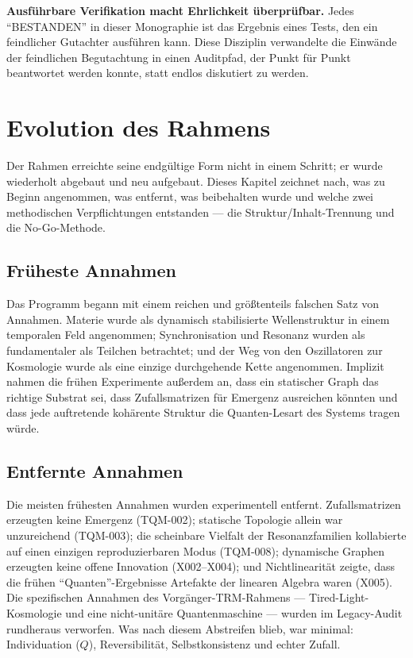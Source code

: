 \documentclass[10pt,twoside,openany]{book}
\begin{document}
\textbf{Ausführbare Verifikation macht Ehrlichkeit überprüfbar.} Jedes ``BESTANDEN'' in
dieser Monographie ist das Ergebnis eines Tests, den ein feindlicher Gutachter ausführen
kann.
Diese Disziplin verwandelte die Einwände der feindlichen Begutachtung in einen
Auditpfad, der Punkt für Punkt beantwortet werden konnte, statt endlos diskutiert zu
werden.

\chapter{Evolution des Rahmens}
\label{ch:evolution}

Der Rahmen erreichte seine endgültige Form nicht in einem Schritt; er wurde wiederholt
abgebaut und neu aufgebaut. Dieses Kapitel zeichnet nach, was zu Beginn angenommen, was
entfernt, was beibehalten wurde und welche zwei methodischen Verpflichtungen entstanden
--- die Struktur/Inhalt-Trennung und die No-Go-Methode.

\section{Früheste Annahmen}

Das Programm begann mit einem reichen und größtenteils falschen Satz von Annahmen. Materie
wurde als dynamisch stabilisierte Wellenstruktur in einem temporalen Feld angenommen;
Synchronisation und Resonanz wurden als fundamentaler als Teilchen betrachtet; und der Weg
von den Oszillatoren zur Kosmologie wurde als eine einzige durchgehende Kette angenommen.
Implizit nahmen die frühen Experimente außerdem an, dass ein statischer Graph das richtige
Substrat sei, dass Zufallsmatrizen für Emergenz ausreichen könnten und dass jede
auftretende kohärente Struktur die Quanten-Lesart des Systems tragen würde.

\section{Entfernte Annahmen}

Die meisten frühesten Annahmen wurden experimentell entfernt. Zufallsmatrizen erzeugten
keine Emergenz (TQM-002); statische Topologie allein war unzureichend (TQM-003); die
scheinbare Vielfalt der Resonanzfamilien kollabierte auf einen einzigen reproduzierbaren
Modus (TQM-008); dynamische Graphen erzeugten keine offene Innovation (X002--X004); und
Nichtlinearität zeigte, dass die frühen ``Quanten''-Ergebnisse Artefakte der linearen
Algebra waren (X005). Die spezifischen Annahmen des Vorgänger-TRM-Rahmens ---
Tired-Light-Kosmologie und eine nicht-unitäre Quantenmaschine --- wurden im
Legacy-Audit rundheraus verworfen. Was nach diesem Abstreifen blieb, war minimal:
Individuation ($Q$), Reversibilität, Selbstkonsistenz und echter Zufall.
\end{document}

